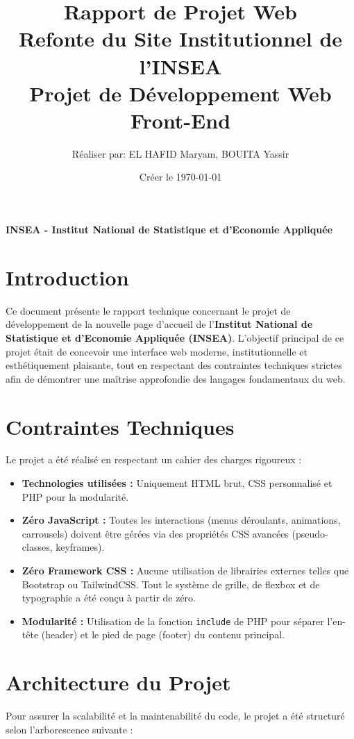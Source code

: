 \documentclass[12pt,a4paper]{article}
\title{
    \vspace{2cm}
    \Huge\textcolor{inseaGreen}{\textbf{Rapport de Projet Web}}\\
    \vspace{0.5cm}
    \Large\textcolor{inseaGold}{\textbf{Refonte du Site Institutionnel de l'INSEA}}\\
    \vspace{1.5cm}
    \large Projet de Développement Web Front-End
}
\author{Réaliser par: EL HAFID Maryam, BOUITA Yassir}
\date{Créer le \today}
\begin{document}
\maketitle
\thispagestyle{empty}
\vspace{2cm}
\begin{center}
    \textbf{INSEA - Institut National de Statistique et d'Economie Appliquée}
\end{center}

\newpage

\section{Introduction}
Ce document présente le rapport technique concernant le projet de développement de la nouvelle page d'accueil de l'\textbf{Institut National de Statistique et d'Economie Appliquée (INSEA)}. L'objectif principal de ce projet était de concevoir une interface web moderne, institutionnelle et esthétiquement plaisante, tout en respectant des contraintes techniques strictes afin de démontrer une maîtrise approfondie des langages fondamentaux du web.

\section{Contraintes Techniques}
Le projet a été réalisé en respectant un cahier des charges rigoureux :
\begin{itemize}
    \item \textbf{Technologies utilisées :} Uniquement HTML brut, CSS personnalisé et PHP pour la modularité.
    \item \textbf{Zéro JavaScript :} Toutes les interactions (menus déroulants, animations, carrousels) doivent être gérées via des propriétés CSS avancées (pseudo-classes, keyframes).
    \item \textbf{Zéro Framework CSS :} Aucune utilisation de librairies externes telles que Bootstrap ou TailwindCSS. Tout le système de grille, de flexbox et de typographie a été conçu à partir de zéro.
    \item \textbf{Modularité :} Utilisation de la fonction \texttt{include} de PHP pour séparer l'en-tête (header) et le pied de page (footer) du contenu principal.
\end{itemize}

\section{Architecture du Projet}
Pour assurer la scalabilité et la maintenabilité du code, le projet a été structuré selon l'arborescence suivante :
\end{document}
